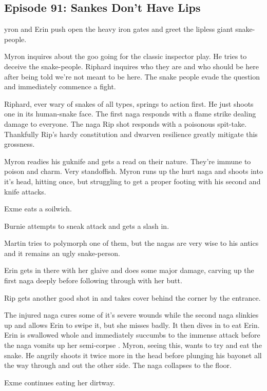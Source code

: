 \subsection{Episode 91: Sankes Don't Have Lips}

yron and Erin push open the heavy iron gates and greet the lipless giant snake-people.\medskip

Myron inquires about the goo going for the classic inspector play. He tries to deceive the snake-people. Riphard inquires who they are and who should be here after being told we’re not meant to be here. The snake people evade the question and immediately commence a fight.\medskip

Riphard, ever wary of snakes of all types, springs to action first. He just shoots one in its human-snake face. The first naga responds with a flame strike dealing damage to everyone. The naga Rip shot responds with a poisonous spit-take. Thankfully Rip’s hardy constitution and dwarven resilience greatly mitigate this grossness.\medskip

Myron readies his guknife and gets a read on their nature. They’re immune to poison and charm. Very standoffish. Myron runs up the hurt naga and shoots into it’s head, hitting once, but struggling to get a proper footing with his second and knife attacks.\medskip

Exme eats a soilwich.\medskip

Burnie attempts to sneak attack and gets a slash in.\medskip

Martin tries to polymorph one of them, but the nagas are very wise to his antics and it remains an ugly snake-person.\medskip

Erin gets in there with her glaive and does some major damage, carving up the first naga deeply before following through with her butt.\medskip

Rip gets another good shot in and takes cover behind the corner by the entrance.\medskip

The injured naga cures some of it’s severe wounds while the second naga slinkies up and allows Erin to swipe it, but she misses badly. It then dives in to eat Erin. Erin is swallowed whole and immediately succumbs to the immense attack before the naga vomits up her semi-corpse . Myron, seeing this, wants to try and eat the snake. He angrily shoots it twice more in the head before plunging his bayonet all the way through and out the other side. The naga collapses to the floor.\medskip

Exme continues eating her dirtway.\medskip

